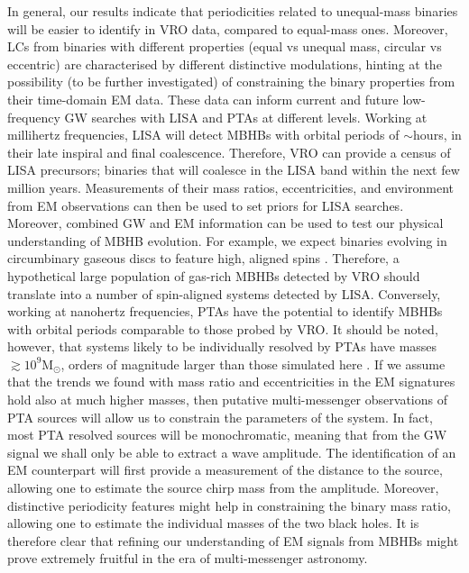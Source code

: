\documentclass{aa}
\begin{document}
In general, our results indicate that periodicities related to unequal-mass binaries will be easier to identify in VRO data, compared to equal-mass ones. Moreover, LCs from binaries with different properties (equal vs unequal mass, circular vs eccentric) are characterised by different distinctive modulations, hinting at the possibility (to be further investigated) of constraining the binary properties from their time-domain EM data. These data can inform current and future low-frequency GW searches with LISA and PTAs at different levels. Working at millihertz frequencies, LISA will detect MBHBs with orbital periods of $\sim$hours, in their late inspiral and final coalescence. Therefore, VRO can provide a census of LISA precursors; binaries that will coalesce in the LISA band within the next few million years. Measurements of their mass ratios, eccentricities, and environment from EM observations can then be used to set priors for LISA searches. Moreover, combined GW and EM information can be used to test our physical understanding of MBHB evolution. For example, we expect binaries evolving in circumbinary gaseous discs to feature high, aligned spins \citep{2010MNRAS.402..682D}. Therefore, a hypothetical large population of gas-rich MBHBs detected by VRO should translate into a number of spin-aligned systems detected by LISA. Conversely, working at nanohertz frequencies, PTAs have the potential to identify MBHBs with orbital periods comparable to those probed by VRO. It should be noted, however, that systems likely to be individually resolved by PTAs have masses $\gtrsim 10^9$M$_\odot$, orders of magnitude larger than those simulated here \citep{2015MNRAS.451.2417R}. If we assume that the trends we found with mass ratio and eccentricities in the EM signatures hold also at much higher masses, then putative multi-messenger observations of PTA sources will allow us to  constrain the parameters of the system. In fact, most PTA resolved sources will be monochromatic, meaning that from the GW signal we shall only be able to extract a wave amplitude. The identification of an EM counterpart will first provide a  measurement of the distance to the source, allowing one to estimate the source chirp mass from the amplitude. Moreover, distinctive periodicity features might help in constraining the binary mass ratio, allowing one to estimate the individual masses of the two black holes. It is therefore clear that refining our understanding of EM signals from MBHBs might prove extremely fruitful in the era of multi-messenger astronomy.
\end{document}
